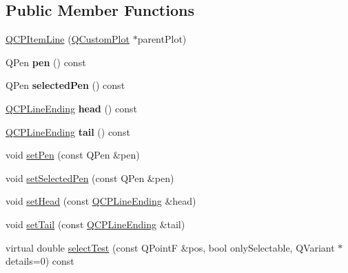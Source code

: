 \subsection*{\-Public \-Member \-Functions}
\begin{DoxyCompactItemize}
\item 
\hyperlink{classQCPItemLine_a17804b7f64961c6accf25b61e85142e3}{\-Q\-C\-P\-Item\-Line} (\hyperlink{classQCustomPlot}{\-Q\-Custom\-Plot} $\ast$parent\-Plot)
\item 
\hypertarget{classQCPItemLine_a235779dd079a263bedb20b3daecc40eb}{\-Q\-Pen {\bfseries pen} () const }\label{classQCPItemLine_a235779dd079a263bedb20b3daecc40eb}

\item 
\hypertarget{classQCPItemLine_a9fde5e95a1a369008252e18f1925650c}{\-Q\-Pen {\bfseries selected\-Pen} () const }\label{classQCPItemLine_a9fde5e95a1a369008252e18f1925650c}

\item 
\hypertarget{classQCPItemLine_a5f6cbc5c763feae9dfbce71748fc43f1}{\hyperlink{classQCPLineEnding}{\-Q\-C\-P\-Line\-Ending} {\bfseries head} () const }\label{classQCPItemLine_a5f6cbc5c763feae9dfbce71748fc43f1}

\item 
\hypertarget{classQCPItemLine_a5d2ca0f784933e80f3e6e1d15dceebb3}{\hyperlink{classQCPLineEnding}{\-Q\-C\-P\-Line\-Ending} {\bfseries tail} () const }\label{classQCPItemLine_a5d2ca0f784933e80f3e6e1d15dceebb3}

\item 
void \hyperlink{classQCPItemLine_a572528dab61c1abe205822fbd5db4b27}{set\-Pen} (const \-Q\-Pen \&pen)
\item 
void \hyperlink{classQCPItemLine_a3e2fec44503277e77717e9c24f87f1ea}{set\-Selected\-Pen} (const \-Q\-Pen \&pen)
\item 
void \hyperlink{classQCPItemLine_aebf3d687114d584e0459db6759e2c3c3}{set\-Head} (const \hyperlink{classQCPLineEnding}{\-Q\-C\-P\-Line\-Ending} \&head)
\item 
void \hyperlink{classQCPItemLine_ac264222c3297a7efe33df9345c811a5f}{set\-Tail} (const \hyperlink{classQCPLineEnding}{\-Q\-C\-P\-Line\-Ending} \&tail)
\item 
virtual double \hyperlink{classQCPItemLine_a7541e5d9378ca121d07b0df3b24f7178}{select\-Test} (const \-Q\-Point\-F \&pos, bool only\-Selectable, \-Q\-Variant $\ast$details=0) const 
\end{DoxyCompactItemize}
